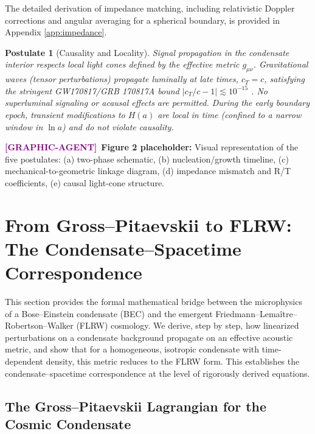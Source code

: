 \documentclass[11pt,a4paper]{article}
\newtheorem{postulate}{Postulate}
\theoremstyle{definition}
\newcommand{\GRAPHAGENT}{\textcolor{purple}{\textbf{[GRAPHIC-AGENT]}}}
\begin{document}
The detailed derivation of impedance matching, including relativistic Doppler corrections and angular averaging for a spherical boundary, is provided in Appendix \ref{app:impedance}.

\begin{postulate}[Causality and Locality]
\label{post:causality}
Signal propagation in the condensate interior respects local light cones defined by the effective metric $g_{\mu\nu}$. Gravitational waves (tensor perturbations) propagate luminally at late times, $c_T = c$, satisfying the stringent GW170817/GRB 170817A bound $|c_T/c - 1| \lesssim 10^{-15}$ \cite{GW170817}. No superluminal signaling or acausal effects are permitted. During the early boundary epoch, transient modifications to $H(a)$ are local in time (confined to a narrow window in $\ln a$) and do not violate causality.
\end{postulate}

\GRAPHAGENT~\textbf{Figure 2 placeholder:} Visual representation of the five postulates: (a) two-phase schematic, (b) nucleation/growth timeline, (c) mechanical-to-geometric linkage diagram, (d) impedance mismatch and R/T coefficients, (e) causal light-cone structure.





\section{From Gross--Pitaevskii to FLRW: The Condensate--Spacetime Correspondence}
\label{sec:formal_bridge}

This section provides the formal mathematical bridge between the microphysics of a Bose--Einstein condensate (BEC) and the emergent Friedmann--Lema\^{i}tre--Robertson--Walker (FLRW) cosmology. We derive, step by step, how linearized perturbations on a condensate background propagate on an effective acoustic metric, and show that for a homogeneous, isotropic condensate with time-dependent density, this metric reduces to the FLRW form. This establishes the condensate--spacetime correspondence at the level of rigorously derived equations.

\subsection{The Gross--Pitaevskii Lagrangian for the Cosmic Condensate}
\label{sec:GP_Lagrangian}
\end{document}
